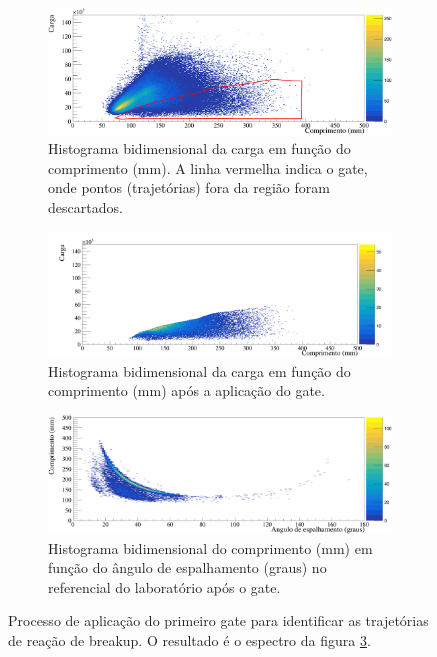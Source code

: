\documentclass[a4paper,12pt,oneside]{book}
\begin{document}
\begin{figure}[H]
\centering
    \begin{subfigure}[b]{\textwidth}
        \centering
        \includegraphics[scale = 0.5, width=\columnwidth]{figs/carga_vs_comp_n2.png}
        \caption{Histograma bidimensional da carga em função do comprimento (mm). A linha vermelha indica o gate, onde pontos (trajetórias) fora da região foram descartados.}
        \label{subfig:carga_comp_cut1}
    \end{subfigure}%
    \hfill
    \begin{subfigure}[b]{\textwidth}
        \centering
        \includegraphics[scale=0.5, width=\columnwidth]{figs/carga_vs_comp_n2_cut1.png}
        \caption{Histograma bidimensional da carga em função do comprimento (mm) após a aplicação do gate.}
        \label{subfig:carga_comp_nocut}
    \end{subfigure}%
	\hfill
    \begin{subfigure}[b]{\textwidth}
        \centering
        \includegraphics[scale=0.5, width=\columnwidth]{figs/comp_vs_ang_n2_cut1.png}
        \caption{Histograma bidimensional do comprimento (mm) em função do ângulo de espalhamento (graus) no referencial do laboratório após o gate.}
        \label{subfig:comp_vs_carga_cut1}
    \end{subfigure}%
    \hfill
\caption{Processo de aplicação do primeiro gate para identificar as trajetórias de reação de breakup. O resultado é o espectro da figura \ref{subfig:comp_vs_carga_cut1}.}
\label{fig:gate_1}
\end{figure}
\end{document}
